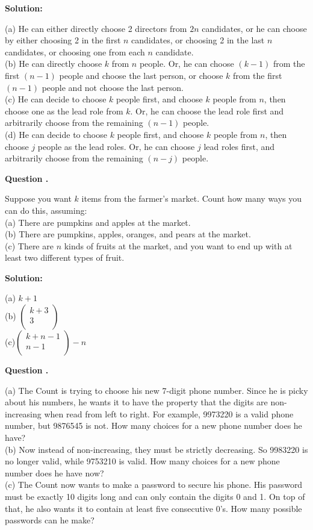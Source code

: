 \documentclass[12pt]{article}
\newcounter{questionnumber}
\newenvironment{question}[1][]{\stepcounter{questionnumber}\par\noindent\textbf{Question \thequestionnumber. #1}\par}{\par}
\newenvironment{solution}{\par\noindent\textbf{Solution:}\par}{\par\vspace{1em}}
\begin{document}
\begin{solution}
    \noindent
    (a) He can either directly choose 2 directors from $2n$ candidates, or he can choose by either choosing 2 in the first $n$ candidates, or choosing 2 in the last $n$ candidates, or choosing one from each $n$ candidate.\\
    (b) He can directly choose $k$ from $n$ people. Or, he can choose $(k-1)$ from the first $(n-1)$ people and choose the last person, or choose $k$ from the first $(n-1)$ people and not choose the last person.\\
    (c) He can decide to choose $k$ people first, and choose $k$ people from $n$, then choose one as the lead role from $k$. Or, he can choose the lead role first and arbitrarily choose from the remaining $(n-1)$ people.\\
    (d) He can decide to choose $k$ people first, and choose $k$ people from $n$, then choose $j$ people as the lead roles. Or, he can choose $j$ lead roles first, and arbitrarily choose from the remaining $(n-j)$ people.
\end{solution}
\begin{question}
    Suppose you want $k$ items from the farmer's market. Count how many ways you can do this, assuming:\\
    (a) There are pumpkins and apples at the market.\\
    (b) There are pumpkins, apples, oranges, and pears at the market.\\
    (c) There are $n$ kinds of fruits at the market, and you want to end up with at least two different types of fruit.
\end{question}
\begin{solution}
    \noindent
    (a) $k+1$\\
    (b) $\left( \begin{array}{c}
	k+3\\
	3\\
    \end{array} \right) $\\
    (c)$\left( \begin{array}{c}
	k+n-1\\
    n-1\\
    \end{array} \right) -n$
\end{solution}
\begin{question}
    \noindent
    (a) The Count is trying to choose his new 7-digit phone number. Since he is picky about his numbers, he wants it to have the property that the digits are non-increasing when read from left to right. For example, 9973220 is a valid phone number, but 9876545 is not. How many choices for a new phone number does he have?\\
    (b) Now instead of non-increasing, they must be strictly decreasing. So 9983220 is no longer valid, while 9753210 is valid. How many choices for a new phone number does he have now?\\
    (c) The Count now wants to make a password to secure his phone. His password must be exactly 10 digits long and can only contain the digits 0 and 1. On top of that, he also wants it to contain at least five consecutive 0's. How many possible passwords can he make?
\end{question}
\end{document}
